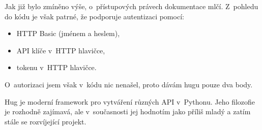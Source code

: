 Jak již bylo zmíněno výše, o~přístupových právech dokumentace mlčí. Z~pohledu do kódu \autocite{hugauth} je však patrné, že podporuje autentizaci pomocí:

\begin{itemize}
\tightlist
\item
  HTTP Basic (jménem a heslem),
\item
  API klíče v~HTTP hlavičce,
\item
  tokenu v~HTTP hlavičce.
\end{itemize}

O~autorizaci jsem však v~kódu nic nenašel, proto dávám hugu pouze dva body.

Hug je moderní framework pro vytváření různých API v~Pythonu. Jeho filozofie je rozhodně zajímavá, ale v~současnosti jej hodnotím jako příliš mladý a zatím stále se rozvíjející projekt.
